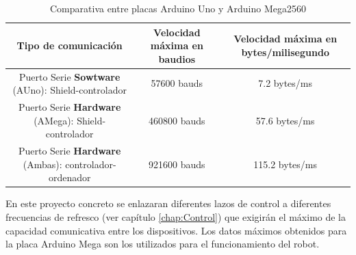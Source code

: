 	 \begin{table}[H]
	 	\caption{Comparativa entre placas Arduino Uno y Arduino Mega2560}
	 	\label{tab:comunication_serial}
	 		\begin{center}
	 			\begin{tabular}{ |c|c|c| }
	 				\hline
	 				\textbf{Tipo de comunicación}& \begin{minipage}{.30\linewidth} \textbf{Velocidad máxima  en baudios}  \end{minipage}& \begin{minipage}{.30\linewidth} \textbf{Velocidad máxima en bytes/milisegundo} \end{minipage} \\
	 				\hline
	 				\begin{minipage}{.30\linewidth}\vspace{2pt} Puerto Serie \textbf{Sowtware} (AUno):  Shield-controlador \vspace{2pt} \end{minipage} & 57600 bauds & 7.2 bytes/ms \\
	 				\hline
	 				\begin{minipage}{.30\linewidth}\vspace{2pt} Puerto Serie \textbf{Hardware} (AMega):  Shield-controlador \vspace{2pt} \end{minipage} & 460800 bauds & 57.6 bytes/ms \\
	 				\hline
	 				\begin{minipage}{.30\linewidth}\vspace{2pt} Puerto Serie \textbf{Hardware} (Ambas):  controlador-ordenador \vspace{2pt} \end{minipage} & 921600 bauds & 115.2 bytes/ms \\
	 				\hline
	 			\end{tabular}
	 		\end{center}
	 \end{table}

	 En este proyecto concreto se enlazaran diferentes lazos de control a diferentes frecuencias de refresco (ver capítulo \ref{chap:Control}) que exigirán el máximo de la capacidad comunicativa entre los dispositivos. Los datos máximos obtenidos para la placa Arduino Mega son los utilizados para el funcionamiento del robot.

